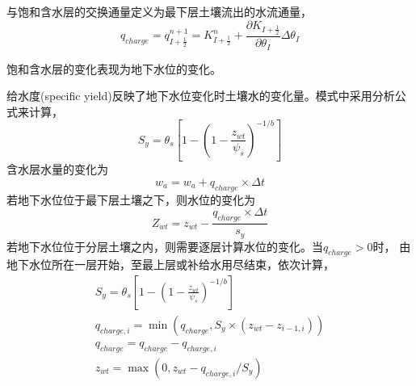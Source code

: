 与饱和含水层的交换通量定义为最下层土壤流出的水流通量，
\begin{equation}
{q}_{ {charge }}=q_{I+\frac{1}{2}}^{n+1}=K_{I+\frac{1}{2}}^{n}+\frac{\partial K_{I+\frac{1}{2}}}{\partial \theta_{I}} \Delta \theta_{I}
\end{equation}

饱和含水层的变化表现为地下水位的变化。

给水度(specific yield)反映了地下水位变化时土壤水的变化量。模式中采用分析公式来计算，
\begin{equation}
{S}_{{y}}=\theta_{s}\left[1-\left(1-\frac{z_{w t}}{\psi_{s}}\right)^{-1 / b}\right]
\end{equation}
含水层水量的变化为
\begin{equation}
w_{a}=w_{a}+q_{charge} \times \Delta t
\end{equation}
若地下水位位于最下层土壤之下，则水位的变化为
\begin{equation}
Z_{w t}=z_{w t}-\frac{q_{charge} \times \Delta t}{s_{y}}
\end{equation}
若地下水位位于分层土壤之内，则需要逐层计算水位的变化。当$q_{charge}>0$时，
由地下水位所在一层开始，至最上层或补给水用尽结束，依次计算，
\begin{equation}
\begin{array}{c}{S}_{{y}}=\theta_{s}\left[1-\left(1-\frac{z_{w t}}{\psi_{s}}\right)^{-1 / b}\right] \\
     q_{ {charge }, i}=\min \left(q_{ {charge }}, S_{y} \times \left(z_{w t}-z_{i-1, i}\right)\right) \\
      q_{ {charge }}=q_{ {charge }}-q_{ {charge }, i} \\ 
      z_{w t}=\max \left(0, z_{w t}-q_{ {charge }, i} / S_{y}\right)\end{array}
\end{equation}


